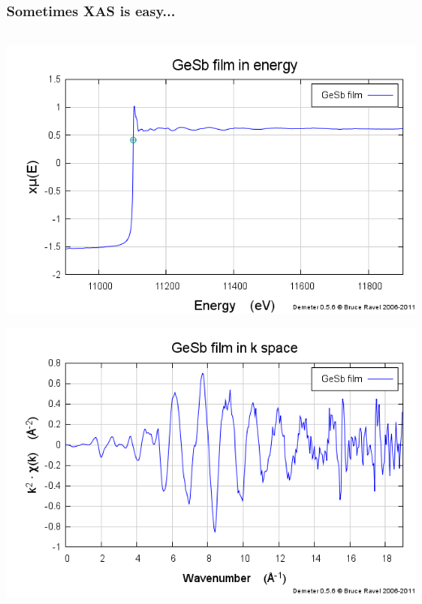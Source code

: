 \documentclass[10pt, xcolor=x11names, compress]{beamer}
\begin{document}
\begin{frame}
  \frametitle{Sometimes XAS is easy...}
  \begin{columns}
    \begin{column}{0.36\linewidth}
      \includegraphics[width=\linewidth]{images/gesb_mu.png}

      \includegraphics[width=\linewidth]{images/gesb_chik.png}      


\end{column}
\end{columns}
\end{frame}
\end{document}
